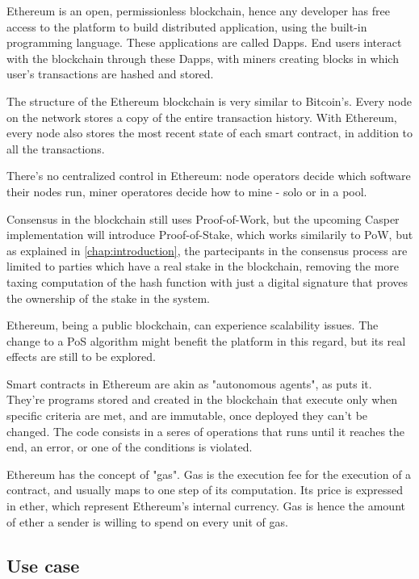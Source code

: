 Ethereum is an open, permissionless blockchain, hence any developer has free access to the platform to build distributed application, using the built-in programming language. These applications are called Dapps. End users interact with the blockchain through these Dapps, with miners creating blocks in which user's transactions are hashed and stored. 

The structure of the Ethereum blockchain is very similar to Bitcoin's. Every node on the network stores a copy of the entire transaction history. With Ethereum, every node also stores the most recent state of each smart contract, in addition to all the transactions. 

There's no centralized control in Ethereum: node operators decide which software their nodes run, miner operatores decide how to mine - solo or in a pool. 

Consensus in the blockchain still uses Proof-of-Work, but the upcoming Casper implementation will introduce Proof-of-Stake, which works similarily to PoW, but as explained in \ref{chap:introduction}, the partecipants in the consensus process are limited to parties which have a real stake in the blockchain, removing the more taxing computation of the hash function with just a digital signature that proves the ownership of the stake in the system.

Ethereum, being a public blockchain, can experience scalability issues. The change to a PoS algorithm might benefit the platform in this regard, but its real effects are still to be explored.

Smart contracts in Ethereum are akin as "autonomous agents", as \cite{ethereumwhitepaper} puts it. They're programs stored and created in the blockchain that execute only when specific criteria are met, and are immutable, once deployed they can't be changed. The code consists in a seres of operations that runs until it reaches the end, an error, or one of the conditions is violated.

Ethereum has the concept of "gas". Gas is the execution fee for the execution of a contract, and usually maps to one step of its computation. Its price is expressed in ether, which represent Ethereum's internal currency. Gas is hence the amount of ether a sender is willing to spend on every unit of gas.

\subsection{Use case}

